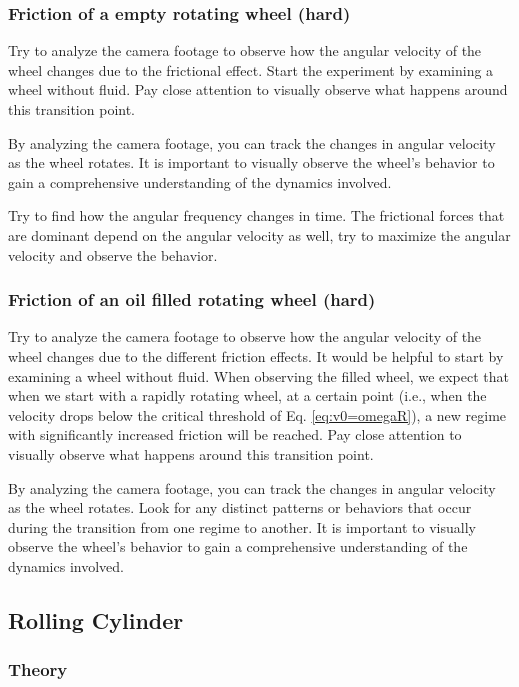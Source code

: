 \documentclass{article}
\begin{document}
\subsubsection{Friction of a empty rotating wheel (hard)}
Try to analyze the camera footage to observe how the angular velocity of the wheel changes due to the frictional effect. Start the experiment by examining a wheel without fluid. Pay close attention to visually observe what happens around this transition point.

By analyzing the camera footage, you can track the changes in angular velocity as the wheel rotates. It is important to visually observe the wheel's behavior to gain a comprehensive understanding of the dynamics involved.

Try to find how the angular frequency changes in time. The frictional forces that are dominant depend on the angular velocity as well, try to maximize the angular velocity and observe the behavior. 

\subsubsection{Friction of an oil filled rotating wheel (hard)}
Try to analyze the camera footage to observe how the angular velocity of the wheel changes due to the different friction effects. It would be helpful to start by examining a wheel without fluid. When observing the filled wheel, we expect that when we start with a rapidly rotating wheel, at a certain point (i.e., when the velocity drops below the critical threshold of Eq. \ref{eq:v0=omegaR}), a new regime with significantly increased friction will be reached. Pay close attention to visually observe what happens around this transition point.

By analyzing the camera footage, you can track the changes in angular velocity as the wheel rotates. Look for any distinct patterns or behaviors that occur during the transition from one regime to another. It is important to visually observe the wheel's behavior to gain a comprehensive understanding of the dynamics involved.



\newpage

\subsection{Rolling Cylinder}
\subsubsection{Theory}
\end{document}

